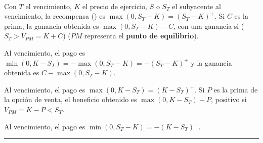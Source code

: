 \begin{f}

\ %


Con \(T\) el vencimiento, \(K\) el precio de ejercicio, \(S\) o \(S_T\) el subyacente al vencimiento, la recompensa () es \(\max (0, S_T-K)=( S_T-K)^{+}\).
Si \(C\) es la prima, la ganancia obtenida es \(\max (0, S_T-K)-C\), con una ganancia si (\(S_T>V_{PM}=K + C\)) (\(PM\) representa el \textbf{punto de equilibrio}).

		


\medskip



Al vencimiento, el pago es \(\min (0,K- S_T)=-\max(0, S_T-K)=-( S_T-K)^{+}\) y la ganancia obtenida es \(C-\max (0, S_T-K)\).

\medskip

		
\medskip



Al vencimiento, el pago es \(\max (0,K- S_T)=(K- S_T)^{+}\).
Si \(P\) es la prima de la opción de venta, el beneficio obtenido es \(\max (0,K- S_T)-P\), positivo si \(V_{PM}=K -P<S_T\).

\medskip

	    	     


\medskip

	    	     

Al vencimiento, el pago es \(\min (0, S_T-K)=-(K- S_T)^+\).


\end{f}
\hrule

